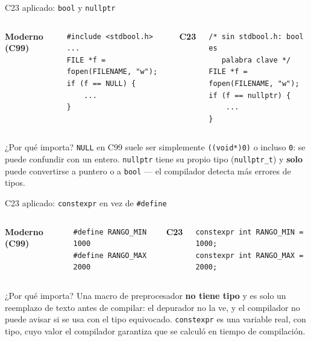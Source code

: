 \documentclass[aspectratio=169]{beamer}
\begin{document}
\begin{frame}[fragile]{C23 aplicado: \texttt{bool} y \texttt{nullptr}}
    \begin{columns}[T]
        \textbf{Moderno (C99)}
        \begin{lstlisting}
#include <stdbool.h>
...
FILE *f = fopen(FILENAME, "w");
if (f == NULL) {
    ...
}
        \end{lstlisting}

        \textbf{C23}
        \begin{lstlisting}
/* sin stdbool.h: bool es
   palabra clave */
FILE *f = fopen(FILENAME, "w");
if (f == nullptr) {
    ...
}
        \end{lstlisting}
    \end{columns}

    \vspace{0.5em}
    \begin{alertblock}{¿Por qué importa?}
        \texttt{NULL} en C99 suele ser simplemente \texttt{((void*)0)} o
        incluso \texttt{0}: se puede confundir con un entero. \texttt{nullptr}
        tiene su propio tipo (\texttt{nullptr\_t}) y \textbf{solo} puede
        convertirse a puntero o a \texttt{bool} — el compilador detecta más
        errores de tipos.
    \end{alertblock}
\end{frame}

\begin{frame}[fragile]{C23 aplicado: \texttt{constexpr} en vez de \texttt{\#define}}
    \begin{columns}[T]
        \textbf{Moderno (C99)}
        \begin{lstlisting}
#define RANGO_MIN 1000
#define RANGO_MAX 2000
        \end{lstlisting}

        \textbf{C23}
        \begin{lstlisting}
constexpr int RANGO_MIN = 1000;
constexpr int RANGO_MAX = 2000;
        \end{lstlisting}
    \end{columns}

    \vspace{0.5em}
    \begin{alertblock}{¿Por qué importa?}
        Una macro de preprocesador \textbf{no tiene tipo} y es solo un
        reemplazo de texto antes de compilar: el depurador no la ve, y el
        compilador no puede avisar si se usa con el tipo equivocado.
        \texttt{constexpr} es una variable real, con tipo, cuyo valor el
        compilador garantiza que se calculó en tiempo de compilación.
    \end{alertblock}
\end{frame}
\end{document}
